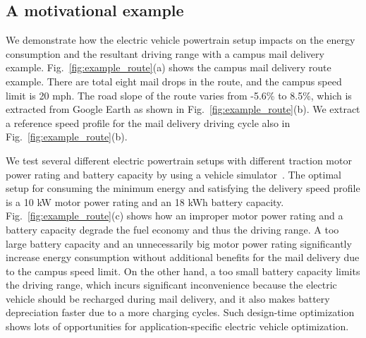 \documentclass[journal]{IEEEtran}
\begin{document}
\subsection{A motivational example}

We demonstrate how the electric vehicle powertrain setup impacts on the energy consumption and the resultant driving range with a campus mail delivery example. Fig.~\ref{fig:example_route}(a) shows the campus mail delivery route example. There are total eight mail drops in the route, and the campus speed limit is 20 mph. The road slope of the route varies from -5.6\% to 8.5\%, which is extracted from Google Earth as shown in Fig.~\ref{fig:example_route}(b). We extract a reference speed profile for the mail delivery driving cycle also in Fig.~\ref{fig:example_route}(b).

We test several different electric powertrain setups with different traction motor power rating and battery capacity by using a vehicle simulator~\cite{Markel:JPS02, Chang:ICCAD14}. The optimal setup for consuming the minimum energy and satisfying the delivery speed profile is a 10 kW motor power rating and an 18 kWh battery capacity. Fig.~\ref{fig:example_route}(c) shows how an improper motor power rating and a battery capacity degrade the fuel economy and thus the driving range. A too large battery capacity and an unnecessarily big motor power rating significantly increase energy consumption without additional benefits for the mail delivery due to the campus speed limit. On the other hand, a too small battery capacity limits the driving range, which incurs significant inconvenience because the electric vehicle should be recharged during mail delivery, and it also makes battery depreciation faster due to a more charging cycles. Such design-time optimization shows lots of opportunities for application-specific electric vehicle optimization. 
\end{document}
